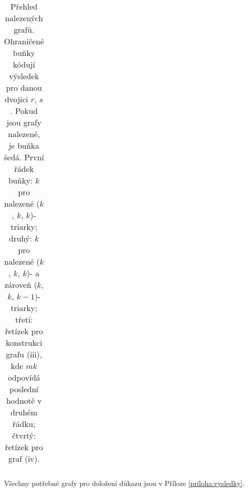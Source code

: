 \begin{table}[h]
{\begin{tabular}{| c || c | c | c |}
\end{tabular}}
\caption{Přehled nalezených grafů. Ohraničené buňky kódují výsledek pro danou dvojici $r$, $s$. Pokud jsou grafy nalezené, je buňka šedá. První řádek buňky: $k$ pro nalezené ($k$, $k$, $k$)-triarky; druhý: $k$ pro nalezené ($k$, $k$, $k$)- a zároveň ($k$, $k$, $k-1$)-triarky; třetí: řetízek pro konstrukci grafu (iii), kde $mk$ odpovídá poslední hodnotě v druhém řádku; čtvrtý: řetízek pro graf (iv).}
\label{obr03:tabvysledkycele}
\end{table}

Všechny potřebné grafy pro doložení důkazu jsou v Příloze \ref{priloha:vysledky}.